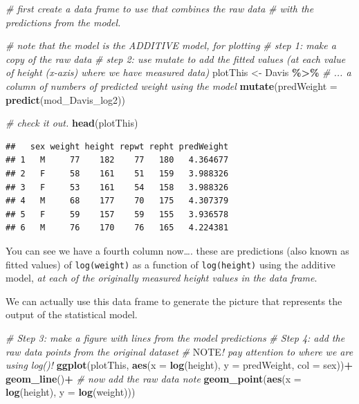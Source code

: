 \documentclass[
]{book}
\newenvironment{Shaded}{\begin{snugshade}}{\end{snugshade}}
\newcommand{\AlertTok}[1]{\textcolor[rgb]{0.94,0.16,0.16}{#1}}
\newcommand{\AttributeTok}[1]{\textcolor[rgb]{0.13,0.29,0.53}{#1}}
\newcommand{\CommentTok}[1]{\textcolor[rgb]{0.56,0.35,0.01}{\textit{#1}}}
\newcommand{\FunctionTok}[1]{\textcolor[rgb]{0.13,0.29,0.53}{\textbf{#1}}}
\newcommand{\NormalTok}[1]{#1}
\newcommand{\OtherTok}[1]{\textcolor[rgb]{0.56,0.35,0.01}{#1}}
\newcommand{\SpecialCharTok}[1]{\textcolor[rgb]{0.81,0.36,0.00}{\textbf{#1}}}
\begin{document}
\begin{Shaded}
\begin{Highlighting}[]
\CommentTok{\# first create a data frame to use that combines the raw data}
\CommentTok{\# with the predictions from the model.}

\CommentTok{\# note that the model is the ADDITIVE model, for plotting}
\CommentTok{\# step 1: make a copy of the raw data}
\CommentTok{\# step 2: use mutate to add the fitted values (at each value of height (x{-}axis) where we have measured data)}
\NormalTok{plotThis }\OtherTok{\textless{}{-}}\NormalTok{ Davis }\SpecialCharTok{\%\textgreater{}\%}
  \CommentTok{\# ... a column of numbers of predicted weight using the model}
  \FunctionTok{mutate}\NormalTok{(}\AttributeTok{predWeight =} \FunctionTok{predict}\NormalTok{(mod\_Davis\_log2))}

\CommentTok{\# check it out.}
\FunctionTok{head}\NormalTok{(plotThis)}
\end{Highlighting}
\end{Shaded}

\begin{verbatim}
##   sex weight height repwt repht predWeight
## 1   M     77    182    77   180   4.364677
## 2   F     58    161    51   159   3.988326
## 3   F     53    161    54   158   3.988326
## 4   M     68    177    70   175   4.307379
## 5   F     59    157    59   155   3.936578
## 6   M     76    170    76   165   4.224381
\end{verbatim}

You can see we have a fourth column now\ldots. these are predictions (also known as fitted values) of \texttt{log(weight)} as a function of \texttt{log(height)} using the additive model, \emph{at each of the originally measured height values in the data frame}.

We can actually use this data frame to generate the picture that represents the output of the statistical model.

\begin{Shaded}
\begin{Highlighting}[]
\CommentTok{\# Step 3: make a figure with lines from the model predictions}
\CommentTok{\# Step 4: add the raw data points from the original dataset}
\CommentTok{\# }\AlertTok{NOTE}\CommentTok{! pay attention to where we are using log()!}
\FunctionTok{ggplot}\NormalTok{(plotThis, }\FunctionTok{aes}\NormalTok{(}\AttributeTok{x =} \FunctionTok{log}\NormalTok{(height), }\AttributeTok{y =}\NormalTok{ predWeight, }\AttributeTok{col =}\NormalTok{ sex))}\SpecialCharTok{+}
  \FunctionTok{geom\_line}\NormalTok{()}\SpecialCharTok{+}
  \CommentTok{\# now add the raw data note}
  \FunctionTok{geom\_point}\NormalTok{(}\FunctionTok{aes}\NormalTok{(}\AttributeTok{x =} \FunctionTok{log}\NormalTok{(height), }\AttributeTok{y =} \FunctionTok{log}\NormalTok{(weight)))}
\end{Highlighting}
\end{Shaded}
\end{document}

